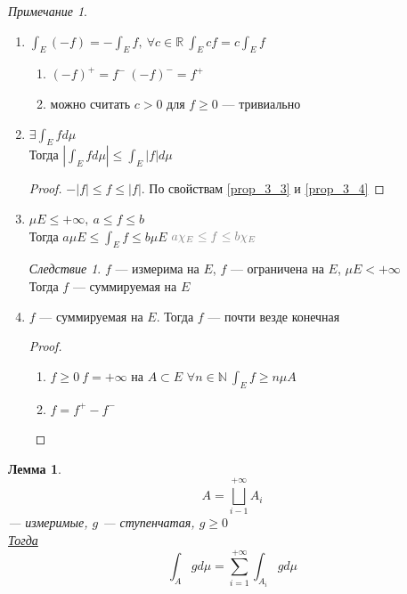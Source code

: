 \documentclass[oneside]{book}
\newcommand{\R}{\mathbb{R}}
\newcommand{\N}{\mathbb{N}}
\theoremstyle{plain}
\newtheorem{lemma}{Лемма}
\theoremstyle{remark}
\newtheorem*{remark}{Примечание}
\newtheorem{corollary}{Следствие}[theorem]
\theoremstyle{definition}
\begin{document}
\begin{remark}
\begin{enumerate}
\emph{Змечание}: \\
\(f\) --- измеримая. Тогда \(f\) --- суммируемая \(\Leftrightarrow\) \(\int |f| < + \infty\) \\
\begin{description}
\item[{\((\Leftarrow)\)}] следует из cвойства \ref{prop_3_1}. \(f^+, f^- \le |f|\)
\item[{\((\Rightarrow)\label{remark_3_1_proof}\)}] позже
\end{description}
\item \label{prop_3_4} \(\int_E(-f) = -\int_E f,\ \forall c \in \R\ \int_E c f = c\int_E f\) \\
\begin{enumerate}
\item \((-f)^+ = f^-\ (-f)^- = f^+\)
\item можно считать \(c > 0\) для \(f \ge 0\) --- тривиально
\end{enumerate}
\item \(\exists \int_E f d\mu\) \\
Тогда \(|\int_E f d\mu| \le \int_E |f| d\mu\)
\begin{proof}
\(-|f| \le f \le |f|\). По свойствам \ref{prop_3_3} и \ref{prop_3_4}
\end{proof}
\item \(\mu E \le +\infty,\ a\le f\le b\) \\
Тогда \(a\mu E \le \int_E f \le b \mu E\)
\(\color{gray} a\chi_E \le f \le b\chi_E\)
\begin{corollary}
\(f\) --- измерима на \(E\), \(f\) --- ограничена на \(E\), \(\mu E < + \infty\) \\
Тогда \(f\) --- суммируемая на \(E\)
\end{corollary}
\item \(f\) --- суммируемая на \(E\). Тогда \(f\) --- почти везде конечная
\begin{proof}
\-
\begin{enumerate}
\item \(f \ge 0\ f = + \infty\) на \(A \subset E\) \(\forall n \in \N\ \int_E f \ge n\mu A\)
\item \(f = f^+ - f^-\)
\end{enumerate}
\end{proof}
\end{enumerate}
\end{remark}
\begin{lemma}
\label{lemma_3_1}
\[ A = \bigsqcup_{i - 1}^{ + \infty} A_i \]
--- измеримые, \(g\) --- ступенчатая, \(g \ge 0\) \\
\uline{Тогда} \[ \int_A g d\mu = \sum_{i = 1}^{ + \infty}\int_{A_i}g d\mu \]
\end{lemma}
\end{document}
